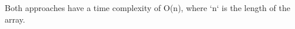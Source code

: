 \documentclass[preview]{standalone}
\begin{document}
Both approaches have a time complexity of O(n), where `n` is the length of the array.\\
\end{document}
